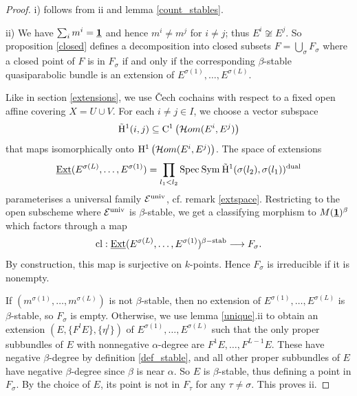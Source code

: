 \documentclass{article}
\begin{document}
\begin{proof}
  i) follows from ii and lemma \ref{count_stables}.

  ii) We have $\sum_i m^i = \underline{\mathbf{1}}$ and hence $m^i \neq m^j$ for $i \neq j$; thus $E^i \not\cong E^j$. So proposition \ref{closed} defines a
  decomposition into closed subsets $F = \bigcup_{\sigma} F_{\sigma}$ where a closed point of $F$ is in $F_{\sigma}$ if and only if the corresponding
  $\beta$-stable quasiparabolic bundle is an extension of $E^{\sigma(1)}, \ldots, E^{\sigma(L)}$.

  Like in section \ref{extensions}, we use \v{C}ech cochains with respect to a fixed open affine covering $X = U \cup V$. For each $i \neq j \in I$,
  we choose a vector subspace
  \begin{displaymath}
    \tilde{\mathrm{H}}^1(i, j) \subseteq \mathrm{C}^1 \left( \mathcal{H}om( E^i, E^j) \right)
  \end{displaymath}
  that maps isomorphically onto $\mathrm{H}^1 \left( \mathcal{H}om( E^i, E^j) \right)$. The space of extensions
  \begin{displaymath}
    \underline{\mathrm{Ext}}(E^{\sigma(L)}, \ldots, E^{\sigma(1)}) = \prod_{l_1<l_2} \mathrm{Spec}\: \mathrm{Sym}\: \tilde{\mathrm{H}}^1( \sigma(l_2), \sigma(l_1))^{\mathrm{dual}}
  \end{displaymath}
  parameterises a universal family $\mathcal{E}^{\mathrm{univ}}$, cf. remark \ref{extspace}. Restricting to the open subscheme where $\mathcal{E}^{\mathrm{univ}}$ is $\beta$-stable, we
  get a classifying morphism to $M(\underline{\mathbf{1}})^{\beta}$ which factors through a map
  \begin{displaymath}
    \mathrm{cl}: \underline{\mathrm{Ext}}(E^{\sigma(L)}, \ldots, E^{\sigma(1)})^{\beta-\mathrm{stab}} \stackrel{}{\longrightarrow} F_{\sigma}.
  \end{displaymath}
  By construction, this map is surjective on $k$-points. Hence $F_{\sigma}$ is irreducible if it is nonempty.

  If $(m^{\sigma(1)}, \ldots, m^{\sigma(L)})$ is not $\beta$-stable, then no extension of $E^{\sigma(1)}, \ldots, E^{\sigma(L)}$ is $\beta$-stable,
  so $F_{\sigma}$ is empty. Otherwise, we use lemma \ref{unique}.ii to obtain an extension $(E, \{F^l E\}, \{\eta^l\})$ of $E^{\sigma(1)}, \ldots,
  E^{\sigma(L)}$ such that the only proper subbundles of $E$ with nonnegative $\alpha$-degree are $F^1 E, \ldots, F^{L-1} E$. These have negative
  $\beta$-degree by definition \ref{def_stable}, and all other proper subbundles of $E$ have negative $\beta$-degree since $\beta$ is near $\alpha$.
  So $E$ is $\beta$-stable, thus defining a point in $F_{\sigma}$. By the choice of $E$, its point is not in $F_{\tau}$ for any $\tau \neq \sigma$.
  This proves ii.


\end{proof}
\end{document}
